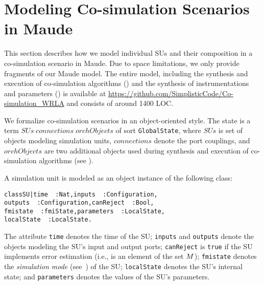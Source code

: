 
\section{Modeling Co-simulation Scenarios in Maude}
\label{sec:model}

This section describes how we model  individual SUs and their
composition in a co-simulation scenario in Maude.
%
Due to space limitations, we only provide fragments of our Maude
model. 
The entire model, including the synthesis and execution of co-simulation
algorithms () and the synthesis of
instrumentations and parameters ()  is
available at \url{https://github.com/SimplisticCode/Co-simulation_WRLA} and consists of around 
1400 LOC. 

We formalize  co-simulation scenarios in an object-oriented style. The
 state is a term
 \texttt{}$\mathit{SUs}\;\mathit{connections}\;\mathit{orchObjects}$\texttt{}
 of sort \texttt{GlobalState}, 
 where $\mathit{SUs}$ is set of objects modeling simulation units,
$\mathit{connections}$ denote the port couplings, and
$\mathit{orchObjects}$ are two additional objects used
during synthesis and execution of co-simulation algorithms (see
). 


A simulation unit  is modeled as an object instance of the following
class: %
\small
\begin{alltt}
class SU | time\,\,: Nat,                inputs\,\,: Configuration,
           outputs\,\,: Configuration,   canReject\,\,: Bool,
           fmistate\,\,: fmiState,       parameters\,\,: LocalState,
           localState\,\,: LocalState .
\end{alltt}
\normalsize

\noindent The attribute \texttt{time} denotes the time of the SU; 
\texttt{inputs} and \texttt{outputs} denote the objects modeling the
SU's input and output 
ports; \texttt{canReject}  is \texttt{true} if  the SU
implements error estimation (i.e., is an element of the set
$M$);  
\texttt{fmistate} denotes the \emph{simulation mode}
(see~\cite{FMI2014}) of the SU; \texttt{localState} denotes the SU's internal
state; and \texttt{parameters} denotes the values of the SU's
parameters. 

